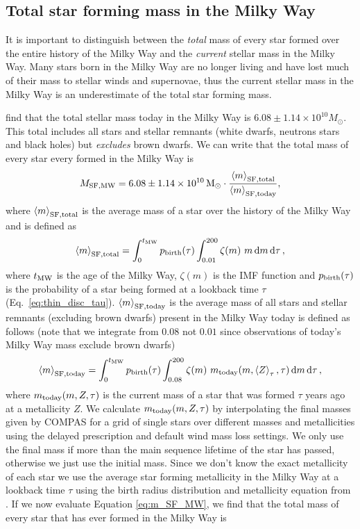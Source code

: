 \subsection{Total star forming mass in the Milky Way}
It is important to distinguish between the \textit{total} mass of every star formed over the entire history of the Milky Way and the \textit{current} stellar mass in the Milky Way. Many stars born in the Milky Way are no longer living and have lost much of their mass to stellar winds and supernovae, thus the current stellar mass in the Milky Way is an underestimate of the total star forming mass.

\citet{Licquia+2015} find that the total stellar mass today in the Milky Way is $6.08 \pm 1.14 \times 10^{10} \unit{M_{\odot}}$. This total includes all stars and stellar remnants (white dwarfs, neutrons stars and black holes) but \textit{excludes} brown dwarfs. We can write that the total mass of every star every formed in the Milky Way is
\begin{equation}\label{eq:m_SF_MW}
    M_{\rm SF, MW} = 6.08 \pm 1.14 \times 10^{10} \unit{M_{\rm \odot}} \cdot \frac{\avg{m}_{\rm SF, total}}{\avg{m}_{\rm SF, today}},
\end{equation}
where $\left\langle m\right\rangle_{\rm SF, total}$ is the average mass of a star over the history of the Milky Way and is defined as
\begin{equation}
    \avg{m}_{\rm SF, total} = \int_{0}^{t_{\rm MW}} p_{\rm birth}(\tau) \int_{0.01}^{200} \zeta(m)\ m \dd{m} \dd{\tau},
\end{equation}
where $t_{\rm MW}$ is the age of the Milky Way, $\zeta(m)$ is the \citet{Kroupa+2001} IMF function and $p_{\rm birth}(\tau)$ is the probability of a star being formed at a lookback time $\tau$ (Eq.~\ref{eq:thin_disc_tau}). $\left\langle m\right\rangle_{\rm SF, today}$ is the average mass of all stars and stellar remnants (excluding brown dwarfs) present in the Milky Way today is defined as follows (note that we integrate from $0.08$ not $0.01$ since observations of today's Milky Way mass exclude brown dwarfs)
\begin{equation}
    \avg{m}_{\rm SF, today} = \int_{0}^{t_{\rm MW}} p_{\rm birth}(\tau) \int_{0.08}^{200} \zeta(m)\ m_{\rm today}(m, \avg{Z}_\tau, \tau) \dd{m} \dd{\tau},
\end{equation}
where $m_{\rm today}(m, Z, \tau)$ is the current mass of a star that was formed $\tau$ years ago at a metallicity $Z$. We calculate $m_{\rm today}(m, Z, \tau)$ by interpolating the final masses given by COMPAS for a grid of single stars over different masses and metallicities using the \citet{Fryer+2012} delayed prescription and default wind mass loss settings. We only use the final mass if more than the main sequence lifetime of the star has passed, otherwise we just use the initial mass. Since we don't know the exact metallicity of each star we use the average star forming metallicity in the Milky Way at a lookback time $\tau$ using the birth radius distribution and metallicity equation from \citet{Frankel+2018}. If we now evaluate Equation \ref{eq:m_SF_MW}, we find that the total mass of every star that has ever formed in the Milky Way is

